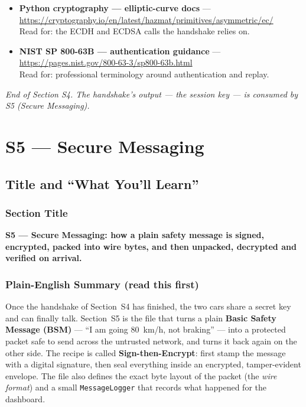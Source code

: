 \documentclass[11pt,a4paper]{report}
\begin{document}
\begin{itemize}
        \url{https://docs.python.org/3/library/json.html}\\
        Read for: \texttt{json.dumps} / \texttt{json.loads} used by
        \texttt{to\_json} / \texttt{from\_json}.
  \item \textbf{Python cryptography --- elliptic-curve docs} ---
        \url{https://cryptography.io/en/latest/hazmat/primitives/asymmetric/ec/}\\
        Read for: the ECDH and ECDSA calls the handshake relies on.
  \item \textbf{NIST SP 800-63B --- authentication guidance} ---
        \url{https://pages.nist.gov/800-63-3/sp800-63b.html}\\
        Read for: professional terminology around authentication and replay.
\end{itemize}

\vfill
\begin{center}\footnotesize\itshape
End of Section S4. The handshake's output --- the session key --- is consumed by
S5 (Secure Messaging).
\end{center}



\chapter{S5 --- Secure Messaging}

\section{Title and ``What You'll Learn''}

\subsection*{Section Title}
\textbf{S5 --- Secure Messaging: how a plain safety message is signed, encrypted,
packed into wire bytes, and then unpacked, decrypted and verified on arrival.}

\subsection*{Plain-English Summary (read this first)}
Once the handshake of Section~S4 has finished, the two cars share a secret key
and can finally talk. Section~S5 is the file that turns a plain
\textbf{Basic Safety Message (BSM)} --- ``I am going 80~km/h, not braking'' ---
into a protected packet safe to send across the untrusted network, and turns it
back again on the other side. The recipe is called \textbf{Sign-then-Encrypt}:
first stamp the message with a digital signature, then seal everything inside an
encrypted, tamper-evident envelope. The file also defines the exact byte layout
of the packet (the \emph{wire format}) and a small \texttt{MessageLogger} that
records what happened for the dashboard.
\end{document}
